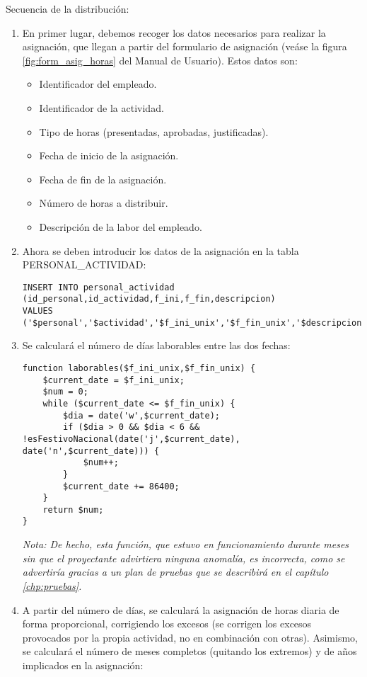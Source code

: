 Secuencia de la distribución:
\begin{enumerate}
\item En primer lugar, debemos recoger los datos necesarios para realizar la
asignación, que llegan a partir del formulario de asignación (veáse la figura
\ref{fig:form_asig_horas} del Manual de Usuario). Estos datos son:

  \begin{itemize}
  \item Identificador del empleado.
  \item Identificador de la actividad.
  \item Tipo de horas (presentadas, aprobadas, justificadas).
  \item Fecha de inicio de la asignación.
  \item Fecha de fin de la asignación.
  \item Número de horas a distribuir.
  \item Descripción de la labor del empleado.
  \end{itemize}

\item Ahora se deben introducir los datos de la asignación en la tabla
PERSONAL\_ACTIVIDAD:

\begin{lstlisting}
INSERT INTO personal_actividad
(id_personal,id_actividad,f_ini,f_fin,descripcion)
VALUES
('$personal','$actividad','$f_ini_unix','$f_fin_unix','$descripcion')";
\end{lstlisting}

\item Se calculará el número de días laborables entre las dos fechas:

\begin{lstlisting}
function laborables($f_ini_unix,$f_fin_unix) {
	$current_date = $f_ini_unix; 
	$num = 0;
	while ($current_date <= $f_fin_unix) {
		$dia = date('w',$current_date);
		if ($dia > 0 && $dia < 6 &&
!esFestivoNacional(date('j',$current_date), date('n',$current_date))) {
			$num++;
		}
		$current_date += 86400;
	}
	return $num;
}
\end{lstlisting}

\textit{Nota: De hecho, esta función, que estuvo en funcionamiento durante meses
sin que el proyectante advirtiera ninguna anomalía, es incorrecta, como se
advertiría gracias a un plan de pruebas que se describirá en el capítulo
\ref{chp:pruebas}.}

\item A partir del número de días, se calculará la asignación de horas diaria
de forma proporcional, corrigiendo los excesos (se corrigen los excesos
provocados por la propia actividad, no en combinación con otras). Asimismo, se
calculará el número de meses completos (quitando los extremos) y de años
implicados en la asignación:


\end{enumerate}
